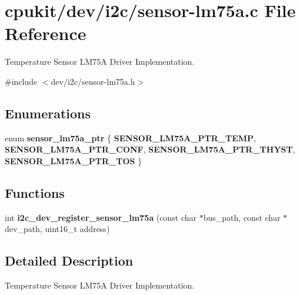 \hypertarget{sensor-lm75a_8c}{}\section{cpukit/dev/i2c/sensor-\/lm75a.c File Reference}
\label{sensor-lm75a_8c}


Temperature Sensor L\+M75A Driver Implementation.  


{\ttfamily \#include $<$dev/i2c/sensor-\/lm75a.\+h$>$}\newline
\subsection*{Enumerations}
\begin{DoxyCompactItemize}
\item 
\mbox{\label{sensor-lm75a_8c_a4042fd86f5bff3cb15cf062fb4f1695f}} 
enum {\bfseries sensor\+\_\+lm75a\+\_\+ptr} \{ {\bfseries S\+E\+N\+S\+O\+R\+\_\+\+L\+M75\+A\+\_\+\+P\+T\+R\+\_\+\+T\+E\+MP}, 
{\bfseries S\+E\+N\+S\+O\+R\+\_\+\+L\+M75\+A\+\_\+\+P\+T\+R\+\_\+\+C\+O\+NF}, 
{\bfseries S\+E\+N\+S\+O\+R\+\_\+\+L\+M75\+A\+\_\+\+P\+T\+R\+\_\+\+T\+H\+Y\+ST}, 
{\bfseries S\+E\+N\+S\+O\+R\+\_\+\+L\+M75\+A\+\_\+\+P\+T\+R\+\_\+\+T\+OS}
 \}
\end{DoxyCompactItemize}
\subsection*{Functions}
\begin{DoxyCompactItemize}
\item 
int {\bfseries i2c\+\_\+dev\+\_\+register\+\_\+sensor\+\_\+lm75a} (const char $\ast$bus\+\_\+path, const char $\ast$dev\+\_\+path, uint16\+\_\+t address)
\end{DoxyCompactItemize}


\subsection{Detailed Description}
Temperature Sensor L\+M75A Driver Implementation. 

